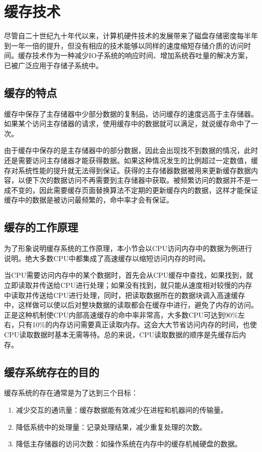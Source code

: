 \section{缓存技术}
\label{sec:cache_tech}

尽管自二十世纪九十年代以来，计算机硬件技术的发展带来了磁盘存储密度每半年到一年一倍的提升，但没有相应的技术能够以同样的速度缩短存储介质的访问时间。缓存技术作为一种减少IO子系统的响应时间、增加系统吞吐量的解决方案，已被广泛应用于存储子系统中。

\subsection{缓存的特点}
缓存中保存了主存储器中少部分数据的复制品，访问缓存的速度远高于主存储器。如果某个访问主存储器的请求，使用缓存中的数据就可以满足，就说缓存命中了一次。

由于缓存中保存的是主存储器中的部分数据，因此会出现找不到数据的情况，此时还是需要访问主存储器才能获得数据。如果这种情况发生的比例超过一定数值，缓存对系统性能的提升就无法得到保证。获得的主存储器数据被用来更新缓存数据内容，以便下次的数据访问不再需要到主存储器中获取。被频繁访问的数据并不是一成不变的，因此需要缓存页面替换算法不定期的更新缓存内的数据，这样才能保证缓存中的数据是被访问最频繁的，命中率才会有保证。

\subsection{缓存的工作原理}
为了形象说明缓存系统的工作原理，本小节会以CPU访问内存中的数据为例进行说明。绝大多数CPU中都集成了高速缓存以缩短访问内存的时间。

当CPU需要访问内存中的某个数据时，首先会从CPU缓存中查找，如果找到，就立即读取并传送给CPU进行处理；如果没有找到，就只能从速度相对较慢的内存中读取并传送给CPU进行处理，同时，把读取数据所在的数据块调入高速缓存中，这样做可以使以后对整块数据的读取都会在缓存中进行，避免了内存的访问。正是这种机制使CPU内部高速缓存的命中率非常高，大多数CPU可达到90\%左右，只有10\%的内存访问需要真正读取内存。这会大大节省访问内存的时间，也使CPU读取数据时基本无需等待。总的来说，CPU读取数据的顺序是先缓存后内存。

\subsection{缓存系统存在的目的}
缓存系统的存在通常是为了达到三个目标：
\begin{enumerate}
\item 减少交互的通讯量：缓存数据能有效减少在进程和机器间的传输量。
\item 降低系统中的处理量：记录处理结果，减少重复处理的次数。
\item 降低主存储器的访问次数：如操作系统在内存中的缓存机械硬盘的数据。
\end{enumerate}

